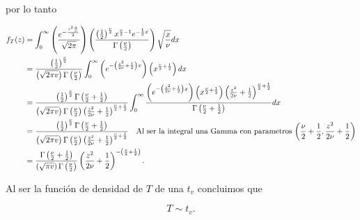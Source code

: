 \documentclass[letterpaper]{article}
\theoremstyle{definition}
\theoremstyle{lemathm}
\theoremstyle{lemathm}
\theoremstyle{lemademthm}
\newcommand{\pars}[1]{\left( #1 \right) }
\newcommand{\1}{\mathbbm{1}}
\begin{document}
\begin{enumerate}
		por lo tanto

		\begin{align*}
			f_T(z) &= \int_{0}^{\infty} \pars{\frac{e^{-\frac{z^2\frac{x}{\nu}}{2}}}{\sqrt{2\pi}}} \pars{\frac{\pars{\frac{1}{2}}^{\frac{\nu}{2}} x^{\frac{\nu}{2}-1} e^{-\frac{1}{2}x}}{\Gamma\pars{\frac{\nu}{2}}}} \sqrt{\frac{x}{\nu}} dx\\
			&= \frac{\pars{\frac{1}{2}}^{\frac{\nu}{2}}}{\pars{\sqrt{2\pi v}}{\Gamma\pars{\frac{\nu}{2}}}} \int_{0}^{\infty} \pars{e^{-\pars{\frac{z^2}{2\nu} + \frac{1}{2}}x}} \pars{x^{\frac{\nu}{2} + \frac{1}{2}}} dx\\
			&= \frac{\pars{\frac{1}{2}}^{\frac{\nu}{2}} \Gamma\pars{\frac{\nu}{2} + \frac{1}{2}}}{\pars{\sqrt{2\pi v}}{\Gamma\pars{\frac{\nu}{2}}}\pars{\frac{z^2}{2\nu} + \frac{1}{2}}^{\frac{\nu}{2} + \frac{1}{2}}} \int_{0}^{\infty} \frac{\pars{e^{-\pars{\frac{z^2}{2\nu} + \frac{1}{2}}x}} \pars{x^{\frac{\nu}{2} + \frac{1}{2}}}\pars{\frac{z^2}{2\nu} + \frac{1}{2}}^{\frac{\nu}{2} + \frac{1}{2}}}{\Gamma\pars{\frac{\nu}{2} + \frac{1}{2}}} dx\\
			&= \frac{\pars{\frac{1}{2}}^{\frac{\nu}{2}} \Gamma\pars{\frac{\nu}{2} + \frac{1}{2}}}{\pars{\sqrt{2\pi v}}{\Gamma\pars{\frac{\nu}{2}}}\pars{\frac{z^2}{2\nu} + \frac{1}{2}}^{\frac{\nu}{2} + \frac{1}{2}}} \text{\quad Al ser la integral una Gamma con parametros $\pars{\frac{\nu}{2} + \frac{1}{2},\frac{z^2}{2\nu} + \frac{1}{2}}$}\\
			&= \frac{\Gamma\pars{\frac{\nu}{2} + \frac{1}{2}}}{\pars{\sqrt{\pi v}}{\Gamma\pars{\frac{\nu}{2}}}} \pars{\frac{z^2}{2\nu} + \frac{1}{2}}^{-\pars{\frac{\nu}{2} + \frac{1}{2}}}.
		\end{align*}

		Al ser la función de densidad de $T$ de una $t_v$ concluimos que

		\[T \sim t_v.\]

		\newpage

    \end{enumerate}

	
\end{document}
